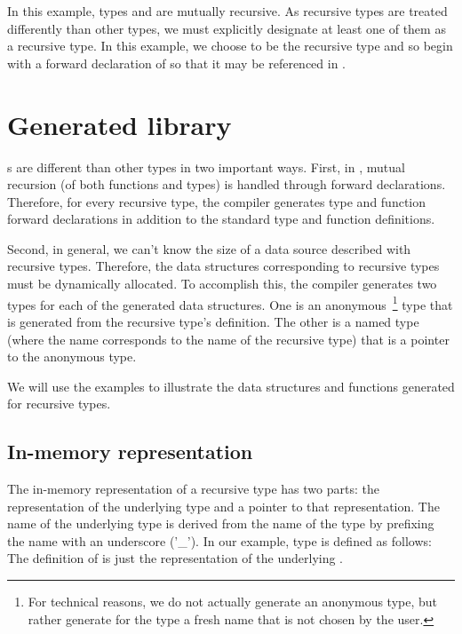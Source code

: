 In this example, types  and  are mutually
recursive. As recursive types are treated differently than other
types, we must explicitly designate at least one of them as a
recursive type.  In this example, we choose  to be the
recursive type and so begin with a forward declaration of  so
that it may be referenced in .

\section{Generated library}

\Precur{}s are different than other types in two important ways.
First, in \C{}, mutual recursion (of both functions and types) is handled
through forward declarations. Therefore, for every recursive type, the
compiler generates type and function forward declarations in addition
to the standard type and function definitions.

Second, in general, we can't know the size of a data source described
with recursive types. Therefore, the data structures corresponding to
recursive types must be dynamically allocated. To accomplish this, the
compiler generates two types for each of the generated data
structures. One is an anonymous~\footnote{For technical reasons, we do
  not actually generate an anonymous type, but rather generate for the
  type a fresh name that is not chosen by the user.} type that is
generated from the recursive type's definition. The other is a named
type (where the name corresponds to the name of the recursive type)
that is a pointer to the anonymous type. 

We will use the  examples to illustrate the data structures
and functions generated for recursive types.

\subsection{In-memory representation}
\label{sec:recur-rep}

The in-memory representation of a recursive type has two parts: the
representation of the underlying type and a pointer to that
representation. The name of the underlying type is derived from the
name of the type by prefixing the name with an underscore ('\_'). In
our example, type  is defined as follows:
The definition of  is just the representation of
the underlying \Punion{}.

